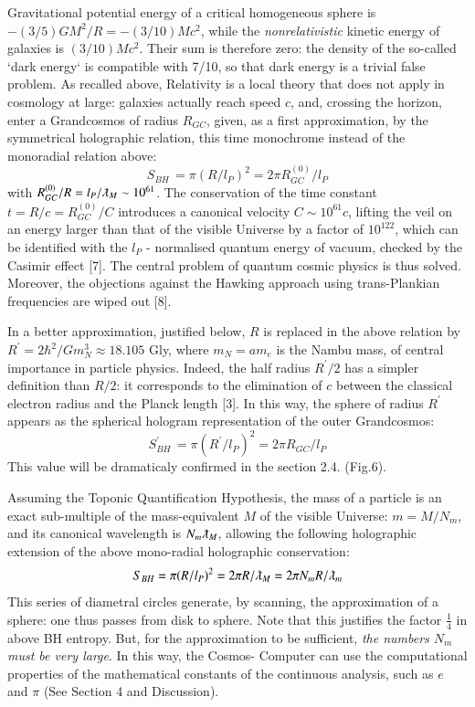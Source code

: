 \documentclass[twoside,draft]{article}
\begin{document}
\begin{sloppypar}
{Gravitational potential energy of a critical homogeneous sphere is $-(3/5)GM^{2}/R = -
(3/10)Mc^{2}$, while the \textit{nonrelativistic} kinetic energy of galaxies is $(3/10)Mc^{2}$. Their sum is therefore zero: the density of the so-called `dark energy` is compatible with 7/10, so that dark energy is a
trivial false problem. As recalled above, Relativity is a local theory that does not apply in
cosmology at large: galaxies actually reach speed $c$, and, crossing the horizon, enter a Grandcosmos of
radius $R_{GC}$, given, as a first approximation, by the symmetrical holographic relation, this time
monochrome instead of the monoradial relation above:
\begin{equation}
S_{BH}\, = \pi(R/l_P )^{2} = 2\pi R^{(0)}_{GC} /l_{P}
\end{equation}
with $R^{(0)}_{GC} /R = l_{P} /\lambdabar_{M} \sim 10^{61}$. The conservation of the time constant $t = R/c = R^{(0)}_{GC} /C$ introduces a canonical velocity $C \sim 10^{61} c$, lifting the veil on an energy larger than that of the visible Universe by a factor of $10^{122}$, which can be identified with the $l_{P}$ - normalised quantum energy of vacuum, checked by
the Casimir effect [7]. The central problem of quantum cosmic physics is thus solved. Moreover, the
objections against the Hawking approach using trans-Plankian frequencies are wiped out [8].

In a better approximation, justified below, $R$ is replaced in the above relation by $R^{\prime} = 2\hbar^{2}/Gm_{N}^{3}
\approx 18.105$ Gly, where $m_{N} = am_{e}$ is the Nambu mass, of central importance in particle
physics. Indeed, the half radius $R^{\prime}/2$ has a simpler definition than $R/2$: it corresponds to the
elimination of $c$ between the classical electron radius and the Planck length [3]. In this way, the sphere
of radius $R^{\prime}$ appears as the spherical hologram representation of the outer Grandcosmos:
\begin{equation}
S^{\prime}_{BH}\, = \pi(R^{\prime}/l_{P})^{2} = 2\pi R_{GC} /l_{P}
\end{equation}
This value will be dramaticaly confirmed in the section 2.4. (Fig.6).

Assuming the Toponic Quantification Hypothesis, the mass of a particle is an exact sub-multiple
of the mass-equivalent $M$ of the visible Universe: $m = M/N_{m}$, and its canonical wavelength is $N_m \lambdabar_{M}$,
allowing the following holographic extension of the above mono-radial holographic conservation:
\begin{equation}
S_{BH} = \pi(R/l_{P})^{2} = 2\pi R/\lambdabar_{M} = 2\pi N_{m} R/\lambdabar_{m}
\end{equation}
This series of diametral circles generate, by scanning, the approximation of a sphere: one thus passes
from disk to sphere. Note that this justifies the factor $\frac{1}{4}$ in above BH entropy. But, for
the approximation to be sufficient, \textit{the numbers $N_{m}$ must be very large}. In this way, the Cosmos-
Computer can use the computational properties of the mathematical constants of the continuous
analysis, such as $e$ and $\pi$ (See Section 4 and Discussion).

}
\end{sloppypar}
\end{document}
